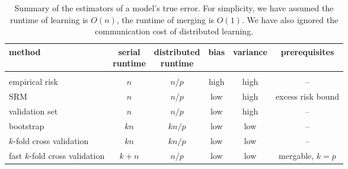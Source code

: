 \documentclass[thesis.tex]{subfiles}
\begin{document}
\begin{table}[t]
    \centering
    \begin{tabular}{lccccc}
        method & \makecell{serial \\ runtime} & \makecell{distributed\\ runtime} & bias & variance & prerequisites \\
        \hline
        \vspace{-0.1in}
        \\
        empirical risk & $n$ & ${n}/{p}$ & high & high & --\\
        SRM & $n$ & ${n}/{p}$ & low & high & excess risk bound\\
        validation set & $n$ & ${n}/{p}$ & low & high& -- \\
        bootstrap & $kn$ & ${kn}/{p}$ & low & low & --\\
        $k$-fold cross validation & $kn$ & ${kn}/{p}$ & low & low & --\\
        fast $k$-fold cross validation & $k+n$ & ${n}/{p}$ & low & low & mergable, $k=p$\\
    \end{tabular}
    \caption{Summary of the estimators of a model's true error.
        For simplicity, we have assumed the runtime of learning is $O(n)$,
        the runtime of merging is $O(1)$.
        We have also ignored the communication cost of distributed learning.
    }
    \label{tab:cv}
\end{table}
\end{document}

